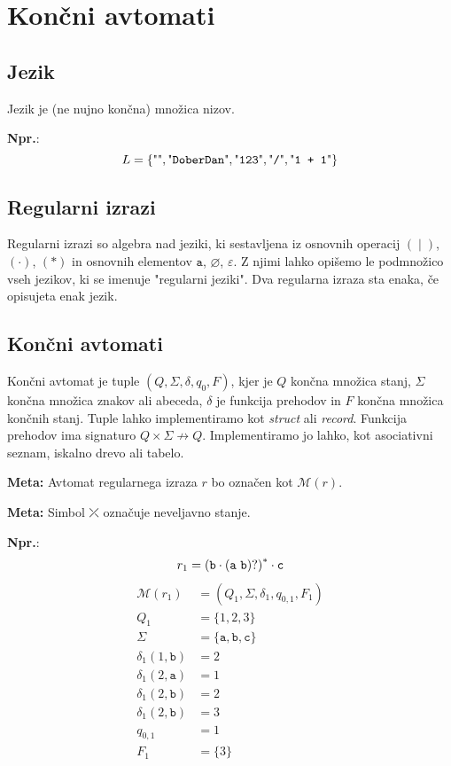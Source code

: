 \documentclass{report}
\newcommand{\Ex}{\textbf{Npr.}:\ }
\newcommand{\Special}[1]{\textbf{#1}}
\newcommand{\Empty}{\varnothing}
\newcommand{\Null}{\varepsilon}
\newcommand{\Alphabet}{\Sigma}
\newcommand{\Automaton}[1]{\mathcal{M}(#1)}
\newcommand{\Str}[1]{\text{\textquotedbl\texttt{#1}\textquotedbl}}
\newcommand{\Char}[1]{\texttt{#1}}
\newcommand{\Seq}{\cdot}
\newcommand{\Spc}{\ }
\newcommand{\Union}{\mathrel{|}}
\newcommand{\Kleene}[1]{{#1}^\ast}
\newcommand{\Err}{\rdiagovfdiag}
\newlength{\arrow}
\begin{document}
\chapter{Končni avtomati}

\section{Jezik}
Jezik je (ne nujno končna) množica nizov.

\Ex
\begin{equation*}
  L = \{\Str{}, \Str{DoberDan}, \Str{123}, \Str{/}, \Str{1 + 1} \}
\end{equation*}

\section{Regularni izrazi}
Regularni izrazi so algebra nad jeziki, ki sestavljena iz osnovnih operacij $(\Union)$, $(\Seq)$, $(\ast)$ in osnovnih elementov $\Char{a}$, $\Empty$, $\Null$.
Z njimi lahko opišemo le podmnožico vseh jezikov, ki se imenuje "regularni jeziki".
Dva regularna izraza sta enaka, če opisujeta enak jezik.

\section{Končni avtomati}

Končni avtomat je tuple $(Q, \Alphabet, \delta, q_0, F)$, kjer je $Q$ končna množica stanj, $\Sigma$ končna množica znakov ali abeceda, $\delta$ je funkcija prehodov in $F$ končna množica končnih stanj.
Tuple lahko implementiramo kot \emph{struct} ali \emph{record}.
Funkcija prehodov ima signaturo $Q \times \Sigma \not\rightarrow Q$.
Implementiramo jo lahko, kot asociativni seznam, iskalno drevo ali tabelo.

\Special{Meta:} Avtomat regularnega izraza $r$ bo označen kot $\Automaton{r}$.

\Special{Meta:} Simbol $\Err$ označuje neveljavno stanje.

\Ex
\begin{equation}
  r_1 = \Kleene{(\Char{b} \Seq (\Char{a} \Spc \Char{b})?)} \Seq \Char{c} \\
\end{equation}
\begin{align*}
  \Automaton{r_1} &= (Q_1, \Sigma, \delta_1, q_{0, 1}, F_1)\\[1em]
  Q_1 &= \{1, 2, 3\} \\[1em]
  \Sigma &= \{\Char{a}, \Char{b}, \Char{c}\} \\[1em]
  \delta_1(1, \Char{b}) & =  2\\
  \delta_1(2, \Char{a}) & =  1\\
  \delta_1(2, \Char{b}) & =  2\\
  \delta_1(2, \Char{b}) & =  3\\[1em]
  q_{0, 1} &= 1 \\[1em]
  F_1 &= \{3\}
\end{align*}
\end{document}
